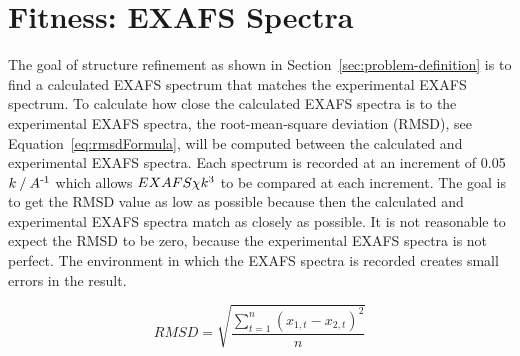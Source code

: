 \section{Fitness: EXAFS Spectra}
\label{sec:fitness-exafs}

The goal of structure refinement as shown in Section~\ref{sec:problem-definition} is to find a calculated EXAFS spectrum that matches the experimental EXAFS spectrum. To calculate how close the calculated EXAFS spectra is to the experimental EXAFS spectra, the root-mean-square deviation (RMSD), see Equation~\ref{eq:rmsdFormula}, will be computed between the calculated and experimental EXAFS spectra. Each spectrum is recorded at an increment of 0.05 $k \mathbin{/} A\textsuperscript{-1}$ which allows $EXAFS \chi k\textsuperscript{3}$ to be compared at each increment. The goal is to get the RMSD value as low as possible because then the calculated and experimental EXAFS spectra match as closely as possible. It is not reasonable to expect the RMSD to be zero, because the experimental EXAFS spectra is not perfect. The environment in which the EXAFS spectra is recorded creates small errors in the result.

\begin{equation}
  \label{eq:rmsdFormula}
  RMSD = \sqrt{\frac{\sum_{t=1}^{n} \left ( x_{1,t}-x_{2,t} \right )^{2}}{n}}
\end{equation}

